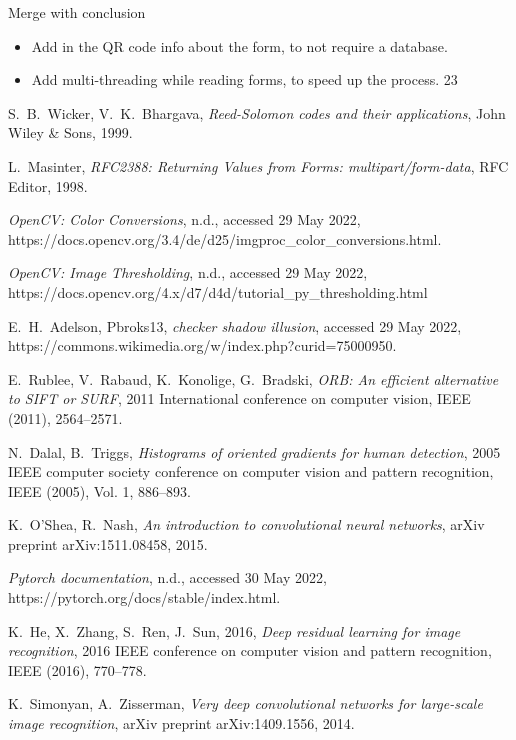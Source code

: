 \documentclass[12pt, a4paper]{report}
\begin{document}
Merge with conclusion

\begin{itemize}
    \item Add in the QR code info about the form, to not require a database.
    \item Add multi-threading while reading forms, to speed up the process. 23
\end{itemize}

\begin{thebibliography}{99}	

S.~B.~Wicker, V.~K.~Bhargava,
\emph{Reed-Solomon codes and their applications},
John Wiley \& Sons, 1999.

L.~Masinter, 
\emph{RFC2388: Returning Values from Forms: multipart/form-data},
RFC Editor, 1998.

\emph{OpenCV: Color Conversions}, n.d., accessed 29 May 2022,  https://docs.opencv.org/3.4/de/d25/imgproc\_color\_conversions.html.

\emph{OpenCV: Image Thresholding}, n.d., accessed 29 May 2022,
https://docs.opencv.org/4.x/d7/d4d/tutorial\_py\_thresholding.html

E.~H.~Adelson, Pbroks13, \emph{checker shadow illusion}, accessed 29 May 2022, https://commons.wikimedia.org/w/index.php?curid=75000950.

E.~Rublee, V.~Rabaud, K.~Konolige, G.~Bradski,
\emph{ORB: An efficient alternative to SIFT or SURF},
	2011 International conference on computer vision, IEEE (2011),
	2564--2571.

N.~Dalal, B.~Triggs,
\emph{Histograms of oriented gradients for human detection},
2005 IEEE computer society conference on computer vision and pattern recognition, IEEE (2005), Vol. 1, 886--893.

K.~O'Shea, R.~Nash,
\emph{An introduction to convolutional neural networks}, arXiv preprint
arXiv:1511.08458, 2015.

\emph{Pytorch documentation}, n.d., accessed 30 May 2022,
https://pytorch.org/docs/stable/index.html.

K.~He, X.~Zhang, S.~Ren, J.~Sun, 2016,
\emph{Deep residual learning for image recognition},
2016 IEEE conference on computer vision and pattern recognition, IEEE (2016), 770--778.

K.~Simonyan, A.~Zisserman,
\emph{Very deep convolutional networks for large-scale image recognition}, arXiv preprint arXiv:1409.1556, 2014.


\end{thebibliography}
\end{document}
